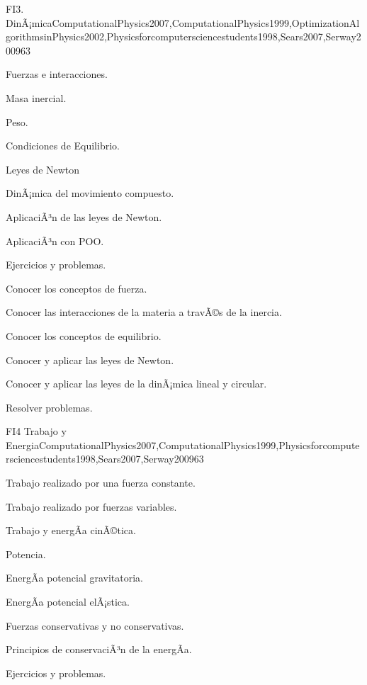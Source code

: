 \begin{syllabus}
\begin{unit}{FI3. DinÃ¡mica}{ComputationalPhysics2007,ComputationalPhysics1999,OptimizationAlgorithmsinPhysics2002,Physicsforcomputersciencestudents1998,Sears2007,Serway2009}{6}{3}
\begin{topics}
      \item Fuerzas e interacciones.
      \item Masa inercial.
      \item Peso.
      \item Condiciones de Equilibrio.
      \item Leyes de Newton
      \item DinÃ¡mica del movimiento compuesto.
      \item AplicaciÃ³n de las leyes de Newton.
      \item AplicaciÃ³n con POO.
      \item Ejercicios y problemas.
   \end{topics}

   \begin{learningoutcomes}
      \item Conocer los conceptos de fuerza.
      \item Conocer las interacciones de la materia a travÃ©s de la inercia.
      \item Conocer los conceptos de equilibrio.
      \item Conocer y aplicar las leyes de Newton.      
      \item Conocer y aplicar las leyes de la dinÃ¡mica lineal y circular.
      \item Resolver problemas.
   \end{learningoutcomes}
\end{unit}

\begin{unit}{FI4 Trabajo y Energia}{ComputationalPhysics2007,ComputationalPhysics1999,Physicsforcomputersciencestudents1998,Sears2007,Serway2009}{6}{3}
\begin{topics}
      \item Trabajo realizado por una fuerza constante.
      \item Trabajo realizado por fuerzas variables.
      \item Trabajo y energÃ­a cinÃ©tica.
      \item Potencia.
      \item EnergÃ­a potencial gravitatoria.
      \item EnergÃ­a potencial elÃ¡stica.
      \item Fuerzas conservativas y no conservativas.
      \item Principios de conservaciÃ³n de la energÃ­a.
      \item Ejercicios y problemas.
   \end{topics}


\end{unit}
\end{syllabus}
